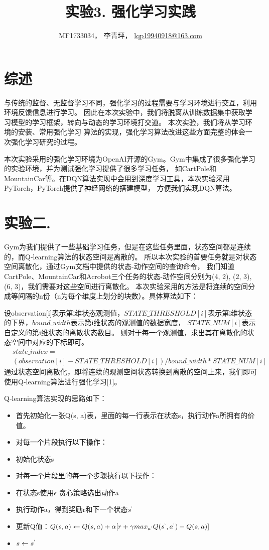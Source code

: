 \documentclass[a4paper,UTF8]{article}
\theoremstyle{definition}
\begin{document}
\title{实验3. 强化学习实践}
\author{MF1733034， 李青坪， \url{lqp19940918@163.com}}
\maketitle

\section*{综述}
与传统的监督、无监督学习不同，强化学习的过程需要与学习环境进行交互，利用环境反馈信息进行学习。
因此在本次实验中，我们将脱离从训练数据集中获取学习模型的学习框架，转向与动态的学习环境打交道。
本次实验，我们将从学习环境的安装、常用强化学习 算法的实现，强化学习算法改进这些方面完整的体会一次强化学习研究的过程。

本次实验采用的强化学习环境为OpenAI开源的Gym。Gym中集成了很多强化学习的实验环境，并为测试强化学习提供了很多学习任务，
如CartPole和MountainCar等。在DQN算法实现中会用到深度学习工具，本次实验采用PyTorch，PyTorch提供了神经网络的搭建模型，
方便我们实现DQN算法。

\section*{实验二. }
Gym为我们提供了一些基础学习任务，但是在这些任务里面，状态空间都是连续的，而Q-learning算法的状态空间是离散的。
所以本次实验的首要任务就是对状态空间离散化，通过Gym文档中提供的状态-动作空间的查询命令，
我们知道CartPole、MountainCar和Acrobot三个任务的状态-动作空间分别为(4, 2), (2, 3), (6, 3)，我们需要对这些空间进行离散化。
本次实验采用的方法是将连续的空间分成等间隔的n份（n为每个维度上划分的块数）。具体算法如下：

	设observation[i]表示第i维状态观测值，$STATE\_THRESHOLD[i]$表示第i维状态的下界，$bound\_width$表示第i维状态的观测值的数据宽度，
$STATE\_NUM[i]$表示自定义的第i维状态的离散状态数目。
则对于每一个观测值，求出其在离散化的状态空间中对应的下标即可。
\begin{align*}
	&state\_index = \\
	&(observation[i] - STATE\_THRESHOLD[i])/bound\_width * STATE\_NUM[i]
\end{align*}
通过状态空间离散化，即将连续的观测空间状态转换到离散的空间上来，我们即可使用Q-learning算法进行强化学习[1]。

Q-learning算法实现的思路如下：
\begin{itemize}
	\item 首先初始化一张Q(s, a)表，里面的每一行表示在状态s，执行动作a所拥有的价值。
	\item 对每一个片段执行以下操作：
	\item 初始化状态s
	\item 对每一个片段里的每一个步骤执行以下操作：
	\item 在状态s使用$\epsilon$ 贪心策略选出动作a
	\item 执行动作a，得到奖励r和下一个状态$s^`$
	\item 更新Q值：$Q(s, a) \gets Q(s, a) + \alpha [r + \gamma max_{a^`}Q(s^`, a^`) - Q(s, a)]$
	\item $s \gets s^`$
\end{itemize}
\end{document}
